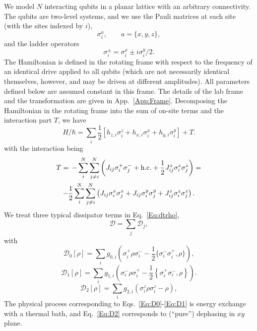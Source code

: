 \documentclass[aps,10pt,pra,twocolumn,groupedaddress,floatfix,superscriptaddress,showpacs,showkeys,amsfonts]{revtex4-2}
\newcommand{\be}{\begin{equation}}
\newcommand{\ee}{\end{equation}}
\newcommand{\eq}[1]{Eq.~\eqref{#1}}
\newcommand{\eqss}[2]{Eqs.~\eqref{#1}-\eqref{#2}}
\newcommand{\app}[1]{App.~\ref{#1}}
\newcommand{\bem}{\begin{multline}}
\begin{document}
 We model $N$ interacting qubits in a planar lattice with an arbitrary connectivity.
The qubits are two-level systems, and we use the Pauli matrices at each site (with the sites indexed by $i$),
\be \sigma_i^a,\qquad a=\{x,y,z\},\ee
and the ladder operators 
\be \sigma^{\pm}_i = {\sigma^{x}_i\pm i\sigma^y_i}/{2}.\ee
The Hamiltonian is defined in the rotating frame with respect to the frequency of an identical drive applied to all qubits (which are not necessarily identical themselves, however, and may be driven at different amplitudes). All parameters defined below are assumed constant in this frame. The details of the lab frame and the transformation are given in \app{App:Frame}.
Decomposing the Hamiltonian in the rotating frame into the sum of on-site terms and the interaction part $T$, we have
\be H/\hbar = \sum_{i}\frac{1}{2}\left[h_{z,i}\sigma_i^z  + h_{x,i}\sigma_i^x + h_{y,i}\sigma_i^y\right] + T.\label{Eq:H0}\ee
with the interaction being 
\bem T = \,-\sum_{ i}^N\sum_{ j\neq i}^N \left(J_{ij}\sigma^+_i \sigma^-_{j} +{\rm h.c.} +\frac{1}{2} J_{ij}^z \sigma^z_i \sigma^z_{j}\right)=\\ -\frac{1}{2}\sum_{ i}^N\sum_{ j\neq i}^N \left(J_{ij}\sigma^x_i \sigma^x_{j} + J_{ij}\sigma^y_i \sigma^y_{j} + J_{ij}^z \sigma^z_i \sigma^z_{j}\right).\label{Eq:Tdef}\end{multline}
We treat three typical dissipator terms in \eq{Eq:dtrho},
\be \mathcal{D} = \sum_j \mathcal{D}_j,\ee
with
\be \mathcal{D}_0[\rho] = \sum_i g_{0,i}\left(\sigma_i^+ \rho\sigma_i^- - \frac{1}{2} \{\sigma_i^- \sigma_i^+,\rho\}\right),\label{Eq:D0}\ee
\be \mathcal{D}_1[\rho]=\sum_i g_{1,i}\left( \sigma_i^-\rho \sigma_i^{+}-\frac{1}{2}\left\{\sigma_i^{+}\sigma_i^-,\rho\right\}\right).\label{Eq:D1}\ee
\be \mathcal{D}_2[\rho] = \sum_i g_{2,i} \left(\sigma_i^z \rho\sigma_i^z - \rho\right),\label{Eq:D2}\ee
 The physical process corresponding to \eqss{Eq:D0}{Eq:D1} is energy exchange with a thermal bath, 
 and \eq{Eq:D2} corresponds to (``pure'') dephasing in $xy$ plane.
\end{document}
